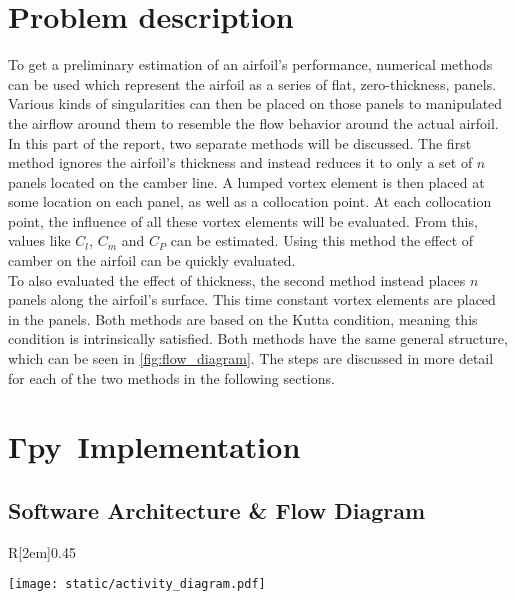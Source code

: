 \newcommand{\numfoil}{$\boldsymbol{\Gamma}$\textbf{py}\ }
\chapter{Problem description}
To get a preliminary estimation of an airfoil's performance, numerical methods
can be used which represent the airfoil as a series of flat, zero-thickness,
panels. Various kinds of singularities can then be placed on those panels to
manipulated the airflow around them to resemble the flow behavior around the
actual airfoil.\\

In this part of the report, two separate methods will be discussed.
The first method ignores the airfoil's thickness and instead reduces it to only
a set of $n$ panels located on the camber line. A lumped vortex element is then
placed at some location on each panel, as well as a collocation point. At each
collocation point, the influence of all these vortex elements will be evaluated.
From this, values like $C_l$, $C_m$ and $C_P$ can be estimated. Using this
method the effect of camber on the airfoil can be quickly evaluated.\\

To also evaluated the effect of thickness, the second method instead places $n$
panels along the airfoil's surface. This time constant vortex elements are
placed in the panels.
Both methods are based on the Kutta condition, meaning this condition is
intrinsically satisfied. Both methods have the same general structure, which can
be seen in \autoref{fig:flow_diagram}. The steps are discussed in more detail
for each of the two methods in the following sections.


\chapter{\numfoil Implementation}

\blindtext

\section{Software Architecture \& Flow Diagram}
\begin{wrapfigure}{R}[2em]{0.45\textwidth}
    \vspace{-2em}
    \begin{center}
      \texttt{[image: static/activity\_diagram.pdf]}
    \end{center}
    \caption{UML Activity Diagram of \numfoil}
    \label{fig:activity}
\end{wrapfigure}

